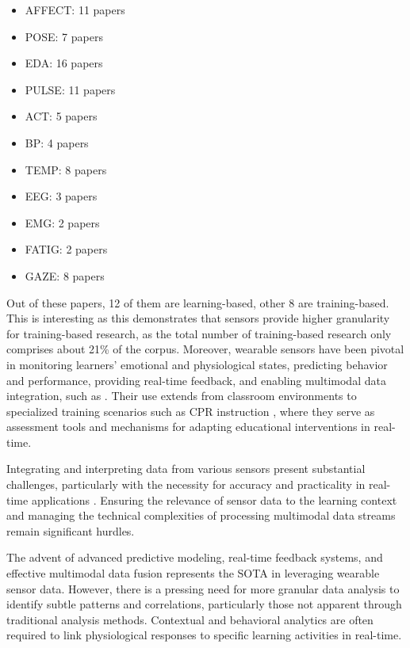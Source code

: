 \documentclass[manuscript,screen,review]{acmart}
\begin{document}
\begin{itemize}
    \item AFFECT: 11 papers
    \item POSE: 7 papers
    \item EDA: 16 papers
    \item PULSE: 11 papers
    \item ACT: 5 papers
    \item BP: 4 papers
    \item TEMP: 8 papers
    \item EEG: 3 papers
    \item EMG: 2 papers
    \item FATIG: 2 papers
    \item GAZE: 8 papers
\end{itemize}

Out of these papers, 12 of them are learning-based, other 8 are training-based. This is interesting as this demonstrates that sensors provide higher granularity for training-based research, as the total number of training-based research only comprises about 21\% of the corpus. Moreover, wearable sensors have been pivotal in monitoring learners' emotional and physiological states, predicting behavior and performance, providing real-time feedback, and enabling multimodal data integration, such as \cite{433919853, 1296637108, 853680639}. Their use extends from classroom environments to specialized training scenarios such as CPR instruction \cite{3009548670}, where they serve as assessment tools and mechanisms for adapting educational interventions in real-time.

Integrating and interpreting data from various sensors present substantial challenges, particularly with the necessity for accuracy and practicality in real-time applications \cite{1763513559, 2000036002}. Ensuring the relevance of sensor data to the learning context and managing the technical complexities of processing multimodal data streams remain significant hurdles.

The advent of advanced predictive modeling, real-time feedback systems, and effective multimodal data fusion represents the SOTA in leveraging wearable sensor data. However, there is a pressing need for more granular data analysis to identify subtle patterns and correlations, particularly those not apparent through traditional analysis methods. Contextual and behavioral analytics are often required to link physiological responses to specific learning activities in real-time.
\end{document}
